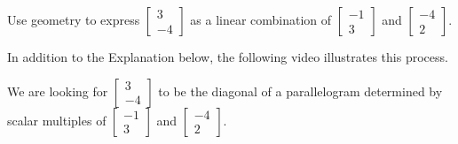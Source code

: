 \documentclass{ximera}
\begin{document}
\begin{example}\label{ex:lincombparallelogrammethod}
Use geometry to express $\begin{bmatrix}3\\-4\end{bmatrix}$ as a linear combination of $\begin{bmatrix}-1\\3\end{bmatrix}$ and $\begin{bmatrix}-4\\2\end{bmatrix}$.

In addition to the Explanation below, the following video illustrates this process.


\begin{explanation}
We are looking for $\begin{bmatrix}3\\-4\end{bmatrix}$ to be the diagonal of a parallelogram determined by scalar multiples of $\begin{bmatrix}-1\\3\end{bmatrix}$ and $\begin{bmatrix}-4\\2\end{bmatrix}$.  

\begin{center}
\end{center}


\end{explanation}
\end{example}
\end{document}
